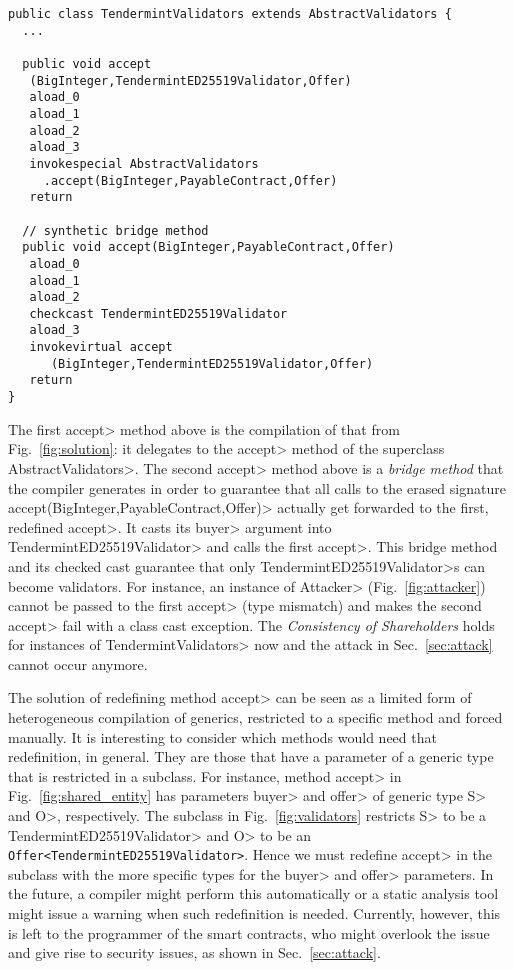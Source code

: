 \begin{lstlisting}[language=JavaBytecode]
public class TendermintValidators extends AbstractValidators {
  ...
  
  public void accept
   (BigInteger,TendermintED25519Validator,Offer)
   aload_0
   aload_1
   aload_2
   aload_3
   invokespecial AbstractValidators
     .accept(BigInteger,PayableContract,Offer)
   return

  // synthetic bridge method
  public void accept(BigInteger,PayableContract,Offer)
   aload_0
   aload_1
   aload_2
   checkcast TendermintED25519Validator
   aload_3
   invokevirtual accept
      (BigInteger,TendermintED25519Validator,Offer)
   return
}
\end{lstlisting}

\noindent
The first \<accept> method above is the compilation of that from Fig.~\ref{fig:solution}:
it delegates to the \<accept> method of the superclass \<AbstractValidators>. The second
\<accept> method above is a \emph{bridge method} that the compiler generates in order to guarantee
that all calls to the erased signature \<accept(BigInteger,PayableContract,Offer)> actually
get forwarded to the first, redefined \<accept>. It casts its \<buyer> argument
into \<TendermintED25519Validator> and calls the first \<accept>. This
bridge method and its checked cast guarantee that only \<TendermintED25519Validator>s
can become validators. For instance, an instance of \<Attacker> (Fig.~\ref{fig:attacker})
cannot be passed to the first \<accept> (type mismatch) and makes the second \<accept>
fail with a class cast exception. The \emph{Consistency of Shareholders} holds
for instances of \<TendermintValidators> now and the attack in Sec.~\ref{sec:attack} cannot occur
anymore.

The solution of redefining method \<accept> can be seen as a limited form of heterogeneous
compilation of generics, restricted to a specific method and forced manually.
It is interesting to consider which methods
would need that redefinition, in general. They are those that have a parameter of a generic type
that is restricted in a subclass. For instance, method \<accept> in
Fig.~\ref{fig:shared_entity} has parameters \<buyer> and \<offer> of generic type
\<S> and \<O>, respectively. The subclass in Fig.~\ref{fig:validators} restricts
\<S> to be a \<TendermintED25519Validator> and \<O> to be
an {\codesize\texttt{Offer<TendermintED25519Validator>}}. Hence we must redefine
\<accept> in the subclass with the more specific types for the \<buyer> and \<offer>
parameters. In the future, a compiler might perform this automatically or a static analysis
tool might issue a warning when such redefinition is needed. Currently, however, this is
left to the programmer of the smart contracts, who might overlook the issue
and give rise to security issues, as shown in Sec.~\ref{sec:attack}.

